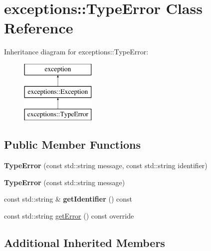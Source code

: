 \hypertarget{classexceptions_1_1TypeError}{}\section{exceptions\+:\+:Type\+Error Class Reference}
\label{classexceptions_1_1TypeError}
Inheritance diagram for exceptions\+:\+:Type\+Error\+:\begin{figure}[H]
\begin{center}
\leavevmode
\includegraphics[height=3.000000cm]{dd/d31/classexceptions_1_1TypeError}
\end{center}
\end{figure}
\subsection*{Public Member Functions}
\begin{DoxyCompactItemize}
\item 
\mbox{\label{classexceptions_1_1TypeError_a397aaaf8636c5accf7ccf04fa6e5fba4}} 
{\bfseries Type\+Error} (const std\+::string message, const std\+::string identifier)
\item 
\mbox{\label{classexceptions_1_1TypeError_a5f9ec99f11ad6fe3e4975f01503965e6}} 
{\bfseries Type\+Error} (const std\+::string message)
\item 
\mbox{\label{classexceptions_1_1TypeError_a4efc952ccf7500b4ddd0e1df72609051}} 
const std\+::string \& {\bfseries get\+Identifier} () const
\item 
const std\+::string \hyperlink{classexceptions_1_1TypeError_aea887128840ec0cab163fe3272418542}{get\+Error} () const override
\end{DoxyCompactItemize}
\subsection*{Additional Inherited Members}


